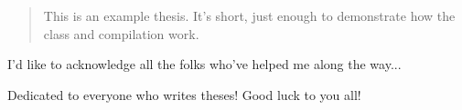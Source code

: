 \begin{abstract}
	This is an example thesis.  It's short, just enough to demonstrate how the class and compilation work.
	
\end{abstract}

\begin{acknowledgements}
	I'd like to acknowledge all the folks who've helped me along the way...
\end{acknowledgements}

\begin{dedication}
	Dedicated to everyone who writes theses!  Good luck to you all!
\end{dedication}


